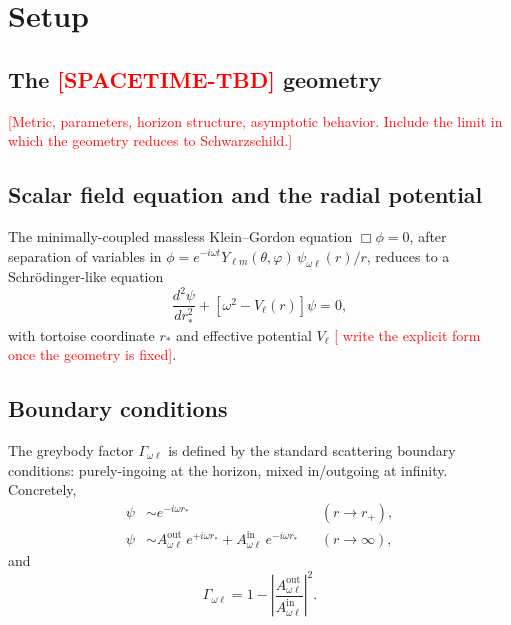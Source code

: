 \documentclass[
  aps,
  prd,
  preprint,      %
  superscriptaddress,
  nofootinbib,
  amsmath,
  amssymb,
  floatfix,
]{revtex4-2}
\begin{document}
\section{Setup}
\label{sec:setup}

\subsection{The \textcolor{red}{[SPACETIME-TBD]} geometry}

\textcolor{red}{[Metric, parameters, horizon structure, asymptotic behavior.
Include the limit in which the geometry reduces to Schwarzschild.]}

\subsection{Scalar field equation and the radial potential}

The minimally-coupled massless Klein--Gordon equation
$\Box \phi = 0$, after separation of variables in
$\phi = e^{-i\omega t} Y_{\ell m}(\theta,\varphi)\, \psi_{\omega\ell}(r)/r$,
reduces to a Schr\"odinger-like equation
\begin{equation}
  \frac{d^2 \psi}{dr_*^2} + \left[\omega^2 - V_\ell(r)\right] \psi = 0,
  \label{eq:radial}
\end{equation}
with tortoise coordinate $r_*$ and effective potential $V_\ell$ \textcolor{red}{[
write the explicit form once the geometry is fixed]}.

\subsection{Boundary conditions}

The greybody factor $\Gamma_{\omega\ell}$ is defined by the standard scattering
boundary conditions: purely-ingoing at the horizon, mixed in/outgoing at
infinity. Concretely,
\begin{align}
  \psi &\sim e^{-i\omega r_*} & &(r \to r_+), \\
  \psi &\sim A^{\mathrm{out}}_{\omega\ell}\, e^{+i\omega r_*}
        + A^{\mathrm{in}}_{\omega\ell}\, e^{-i\omega r_*} & &(r \to \infty),
\end{align}
and
\begin{equation}
  \Gamma_{\omega\ell} = 1 - \left|\frac{A^{\mathrm{out}}_{\omega\ell}}
                                       {A^{\mathrm{in}}_{\omega\ell}}\right|^2.
  \label{eq:greybody-def}
\end{equation}
\end{document}
